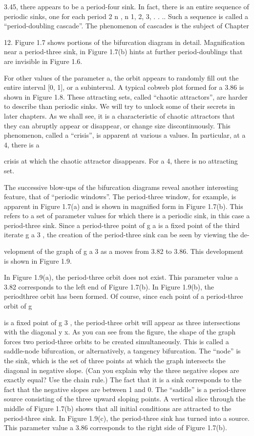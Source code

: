 \documentclass[12pt]{article}
\begin{document}
3.45, there appears to be a period-four sink. In fact, there is an entire sequence of periodic sinks, one 
for each period 2 n , n  1, 2, 3, . . .. Such a sequence is called a “period-doubling cascade”. The 
phenomenon of cascades is the subject of Chapter

12. Figure 1.7 shows portions of the bifurcation diagram in detail. Magnification near a period-three sink, 
in Figure 1.7(b) hints at further period-doublings that are invisible in Figure 1.6.

For other values of the parameter a, the orbit appears to randomly fill out the entire interval [0, 1], or 
a subinterval. A typical cobweb plot formed for a  3.86 is shown in Figure 1.8. These attracting sets, 
called “chaotic attractors”, are harder to describe than periodic sinks. We will try to unlock some of 
their secrets in later chapters. As we shall see, it is a characteristic of chaotic attractors that they 
can abruptly appear or disappear, or change size discontinuously. This phenomenon, called a “crisis”, is 
apparent at various a values. In particular, at a  4, there is a


crisis at which the chaotic attractor disappears. For a 
 4, there is no attracting set.

The successive blow-ups of the bifurcation diagrams reveal another interesting feature, that of “periodic 
windows”. The period-three window, for example, is apparent in Figure 1.7(a) and is shown in magnified form 
in Figure 1.7(b). This refers to a set of parameter values for which there is a periodic sink, in this case 
a period-three sink. Since a period-three point of g a is a fixed point of the third iterate g a 3 , the 
creation of the period-three sink can be seen by viewing the de-

velopment of the graph of g a 3 as a moves from 3.82 to 3.86. This development is shown in Figure 1.9.

In Figure 1.9(a), the period-three orbit does not exist. This parameter value a  3.82 corresponds to the 
left end of Figure 1.7(b). In Figure 1.9(b), the periodthree orbit has been formed. Of course, since each 
point of a period-three orbit of g

is a fixed point of g 3 , the period-three orbit will appear as three intersections with the diagonal y  x. 
As you can see from the figure, the shape of the graph forces two period-three orbits to be created 
simultaneously. This is called a saddle-node bifurcation, or alternatively, a tangency bifurcation. The 
“node” is the sink, which is the set of three points at which the graph intersects the diagonal in negative 
slope. (Can you explain why the three negative slopes are exactly equal? Use the chain rule.) The fact that 
it is a sink corresponds to the fact that the negative slopes are between 1 and 0. The “saddle” is a 
period-three source consisting of the three upward sloping points. A vertical slice through the middle of 
Figure 1.7(b) shows that all initial conditions are attracted to the period-three sink. In Figure 1.9(c), 
the period-three sink has turned into a source. This parameter value a  3.86 corresponds to the right side 
of Figure 1.7(b).
\end{document}
